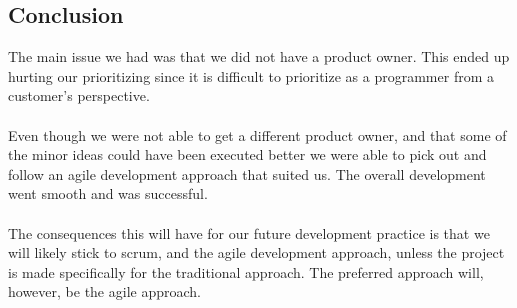 \subsection{Conclusion}
The main issue we had was that we did not have a product owner.
This ended up hurting our prioritizing since it is difficult to prioritize as a programmer from a customer's perspective.

\paragraph{}
Even though we were not able to get a different product owner, and that some of the minor ideas could have been executed better we were able to pick out and follow an agile development approach that suited us.
The overall development went smooth and was successful.

\paragraph{}
The consequences this will have for our future development practice is that we will likely stick to scrum, and the agile development approach, unless the project is made specifically for the traditional approach.
The preferred approach will, however, be the agile approach.